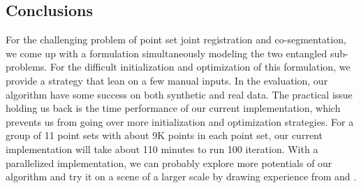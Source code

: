 \subsection{Conclusions}
For the challenging problem of point set joint registration and co-segmentation, we come up with a formulation simultaneously modeling the two entangled sub-problems. For the difficult initialization and optimization of this formulation, we provide a strategy that lean on a few manual inputs. In the evaluation, our algorithm have some success on both synthetic and real data.
The practical issue holding us back is the time performance of our current implementation, which prevents us from going over more initialization and optimization strategies. For a group of 11 point sets with about 9K points in each point set, our current implementation will take about 110 minutes to run 100 iteration.  
With a parallelized implementation, we can probably explore more potentials of our algorithm and try it on a scene of a larger scale by drawing experience from \cite{GOGMA} and \cite{AGM}. 